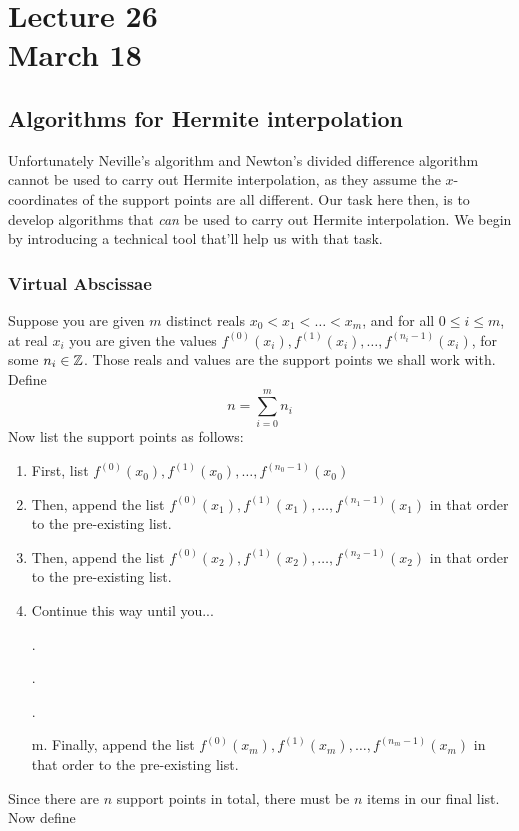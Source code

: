 \chapter*{Lecture 26 \\ March 18}
\setcounter{chapter}{26}
\setcounter{section}{0}

\section{Algorithms for Hermite interpolation}
Unfortunately Neville's algorithm and Newton's divided difference algorithm cannot be used to carry out Hermite interpolation, as they assume the $x$-coordinates of the support points are all different. Our task here then, is to develop algorithms that \textit{can} be used to carry out Hermite interpolation. We begin by introducing a technical tool that'll help us with that task.

\subsection{Virtual Abscissae}
Suppose you are given $m$ distinct reals $x_0 < x_1 < \dots < x_m$, and for all $0 \leq i \leq m$, at real $x_i$ you are given the values $f^{(0)}(x_i), f^{(1)}(x_i), \dots ,f^{(n_i - 1)}(x_i)$, for some $n_i \in \mathbb{Z}$. Those reals and values are the support points we shall work with. Define
\[
  n = \sum_{i = 0}^m n_i
\]
Now list the support points as follows:
\begin{enumerate}
\item
  First, list $f^{(0)}(x_0), f^{(1)}(x_0), \dots ,f^{(n_0 - 1)}(x_0)$
\item
  Then, append the list $f^{(0)}(x_1), f^{(1)}(x_1), \dots ,f^{(n_1 - 1)}(x_1)$ in that order to the pre-existing list.
\item
  Then, append the list $f^{(0)}(x_2), f^{(1)}(x_2), \dots ,f^{(n_2 - 1)}(x_2)$ in that order to the pre-existing list.
\item
  Continue this way until you...
\item[.]
\item[.]
\item[.]
\item[m.]
  Finally, append the list $f^{(0)}(x_m), f^{(1)}(x_m), \dots ,f^{(n_m - 1)}(x_m)$ in that order to the pre-existing list.
\end{enumerate}
Since there are $n$ support points in total, there must be $n$ items in our final list. Now define
\begin{defn}
  
\end{defn}

